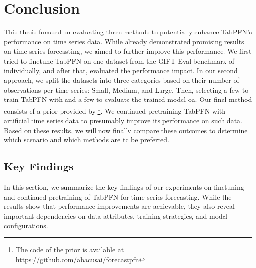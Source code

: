 \chapter{Conclusion}
\label{chap:conclusion}
This thesis focused on evaluating three methods to potentially enhance TabPFN’s performance on time series data.
While \citet{hoo2025tables} already demonstrated promising results on time series forecasting, we aimed to further improve this performance.
We first tried to finetune TabPFN on one dataset from the GIFT-Eval benchmark of \citet{aksu2024giftevalbenchmarkgeneraltime} individually, and after that, evaluated the performance impact.
\newline
In our second approach, we split the datasets into three categories based on their number of observations per time series: Small, Medium, and Large.
Then, selecting a few to train TabPFN with and a few to evaluate the trained model on.
\newline
Our final method consists of a prior provided by \citet{dooley2023forecastpfn}\footnote{The code of the prior is available at \url{https://github.com/abacusai/forecastpfn}}.
We continued pretraining TabPFN with artificial time series data to presumably improve its performance on such data.
\newline
Based on these results, we will now finally compare these outcomes to determine which scenario and which methods are to be preferred.
\section{Key Findings}

In this section, we summarize the key findings of our experiments on finetuning and continued pretraining of TabPFN for time series forecasting.
While the results show that performance improvements are achievable, they also reveal important dependencies on data attributes, training strategies, and model configurations.

